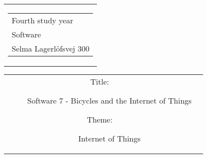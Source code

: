 

\thispagestyle{empty}
\begin{titlingpage}
 \begin{nopagebreak}
 {\samepage 
 \begin{tabular}{r}
\parbox{\textwidth}{  
 \hfill \parbox{4.9cm}{\begin{tabular}{l}
{\small Fourth study year} \\
{\small Software} \\
{\small Selma Lagerlöfsvej 300} \\
 \end{tabular}}
}
\end{tabular}

 \begin{tabular}{cc}
\parbox{7cm}{
\begin{description}

\item[Title:] 

Software 7 - Bicycles and the Internet of Things
  
\item[Theme:]

Internet of Things


 \end{description}

\parbox{8cm}{

}}
\end{tabular}}
\end{nopagebreak}
\end{titlingpage}
